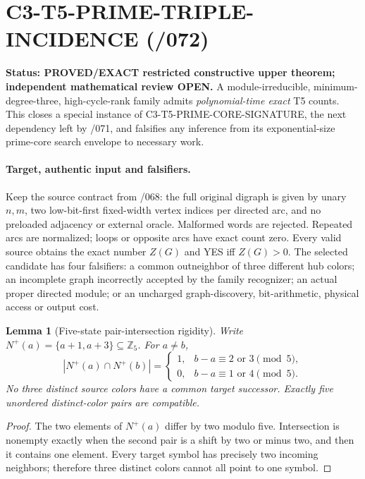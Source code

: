 \documentclass[11pt]{article}
\newtheorem{lemma}{Lemma}
\begin{document}
\clearpage


\section{C3-T5-PRIME-TRIPLE-INCIDENCE (/072)}

\noindent\textbf{Status: PROVED/EXACT restricted constructive upper theorem;
independent mathematical review OPEN.} A module-irreducible,
minimum-degree-three, high-cycle-rank family admits
\emph{polynomial-time exact} T5 counts. This closes a special
instance of \textsf{C3-T5-PRIME-CORE-SIGNATURE}, the next
dependency left by /071, and falsifies any inference from its
exponential-size prime-core search envelope to necessary work.

\paragraph{Target, authentic input and falsifiers.}
Keep the source contract from /068: the full original digraph is
given by unary $n,m$, two low-bit-first fixed-width vertex indices
per directed arc, and no preloaded adjacency or external oracle.
Malformed words are rejected. Repeated arcs are normalized; loops
or opposite arcs have exact count zero. Every valid source obtains
the exact number $Z(G)$ and YES iff $Z(G)>0$.
The selected candidate has four falsifiers: a common outneighbor
of three different hub colors; an incomplete graph incorrectly
accepted by the family recognizer; an actual proper directed
module; or an uncharged graph-discovery, bit-arithmetic, physical
access or output cost.

\begin{lemma}[Five-state pair-intersection rigidity]
Write $N^+(a)=\{a+1,a+3\}\subseteq\mathbb Z_5$.
For $a\ne b$,
\[
|N^+(a)\cap N^+(b)|=
\begin{cases}1,&b-a\equiv2\text{ or }3\pmod5,\\
0,&b-a\equiv1\text{ or }4\pmod5.
\end{cases}
\]
No three distinct source colors have a common target successor.
Exactly five unordered distinct-color pairs are compatible.
\end{lemma}
\begin{proof}
The two elements of $N^+(a)$ differ by two modulo five.
Intersection is nonempty exactly when the second pair is a shift
by two or minus two, and then it contains one element.
Every target symbol has precisely two incoming neighbors;
therefore three distinct colors cannot all point to one symbol.
\end{proof}
\end{document}
